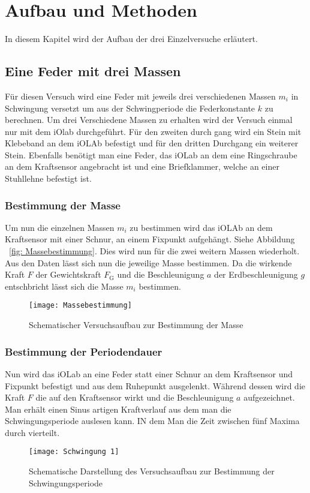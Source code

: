 
\chapter{Aufbau und Methoden}
\label{sec:aufbau}
In diesem Kapitel wird der Aufbau der drei Einzelversuche erläutert.
\section{Eine Feder mit drei Massen}
Für diesen Versuch wird eine Feder mit jeweils drei verschiedenen Massen $m_i$ in Schwingung versetzt um aus der Schwingperiode die Federkonstante $k$ zu berechnen. Um drei Verschiedene Massen zu erhalten wird der Versuch einmal nur mit dem iOlab durchgeführt. Für den zweiten durch gang wird ein Stein mit Klebeband an dem iOLAb befestigt und für den dritten Durchgang ein weiterer Stein. Ebenfalls benötigt man eine Feder, das iOLab an dem eine Ringschraube an dem Kraftsensor angebracht ist und eine Briefklammer, welche an einer Stuhllehne befestigt ist.
\subsection{Bestimmung der Masse}
Um nun die einzelnen Massen $m_i$ zu bestimmen wird das iOLAb an dem Kraftsensor mit einer Schnur, an einem Fixpunkt aufgehängt. Siehe Abbildung ~\ref{fig: Massebestimmung}. Dies wird nun für die zwei weitern Massen wiederholt. Aus den Daten lässt sich nun die jeweilige Masse bestimmen. Da die wirkende Kraft $F$ der Gewichtskraft $F_{\text{G}}$ und die Beschleunigung $a$ der Erdbeschleunigung $g$ entschbricht lässt sich die Masse $m_i$ bestimmen.
\begin{figure}[htb!]
	\label{fig:Massenbestimmung}
	\centering
	\texttt{[image: Massebestimmung]}
	\caption{\label{fig:Massenbestimmung} Schematischer Versuchsaufbau zur Bestimmung der Masse}
\end{figure}
\subsection{Bestimmung der Periodendauer}
Nun wird das iOLab an eine Feder statt einer Schnur an dem Kraftsensor und Fixpunkt befestigt und aus dem Ruhepunkt ausgelenkt. Während dessen wird die Kraft $F$ die auf den Kraftsensor wirkt und die Beschleunigung $a$ aufgezeichnet. Man erhält einen Sinus artigen Kraftverlauf aus dem man die Schwingungsperiode auslesen kann. IN dem Man die Zeit zwischen fünf Maxima durch vierteilt.
\begin{figure}[htb!]
	\centering
	\texttt{[image: Schwingung 1]}
	\caption{\label{fig:Schwingungsperiode1}Schematische Darstellung des Versuchsaufbau zur Bestimmung der Schwingungsperiode}
\end{figure}
